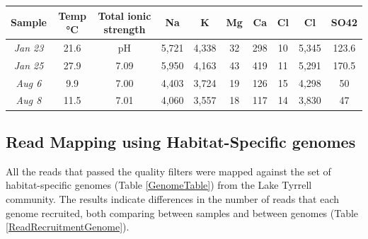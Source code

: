 \clearpage
\thispagestyle{facingcaption}
\begin{table}[h]
\captionsetup{labelformat=prev-page}
\caption{\textbf{Table \ref{LTchemical}:} Physical and chemical composition of the Lake Tyrrell water samples. Concentrations are given in units of \si{\milli\mole\per\liter}}
\label{LTchemical}
\end{table}
\clearpage

\begin{table}
\ContinuedFloat
\captionsetup{labelformat=empty}
\centering

\begin{tabular}{cccccccccc}

\textbf{Sample} & \textbf{Temp \si{\degreeCelsius}} & \textbf{Total ionic strength} & \textbf{Na} & \textbf{K} & \textbf{Mg} & \textbf{Ca} & \textbf{Cl} & \textbf{Cl} & \textbf{SO42} \\
\hline
\textit{Jan 23} & 21.6 & pH & 5,721 & 4,338 & 32 & 298 & 10 & 5,345 & 123.6 \\
\textit{Jan 25} & 27.9 & 7.09 & 5,950 & 4,163 & 43 & 419 & 11 & 5,291 & 170.5 \\
\textit{Aug 6} & 9.9 & 7.00 & 4,403 & 3,724 & 19 & 126 & 15 & 4,298 & 50 \\
\textit{Aug 8} & 11.5 & 7.01 & 4,060 & 3,557 & 18 & 117 & 14 & 3,830 & 47 \\

\end{tabular}
\end{table}


\clearpage
\subsection{Read Mapping using Habitat-Specific genomes}

All the reads that passed the quality filters were mapped against the set of habitat-specific genomes (Table \ref{GenomeTable}) from the Lake Tyrrell community. The results indicate differences in the number of reads that each genome recruited, both comparing between samples and between genomes (Table \ref{ReadRecruitmentGenome}). 

